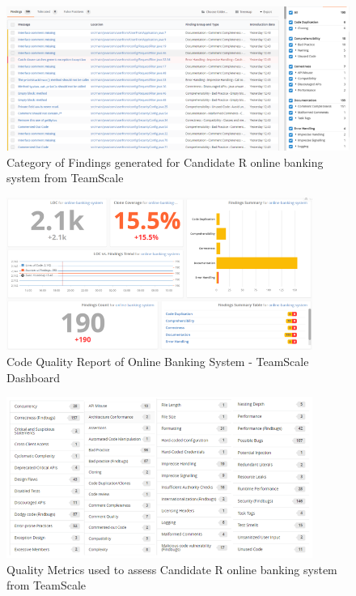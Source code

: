 \documentclass[letterpaper, 11pt]{report}
\begin{document}
\begin{figure}[htb]
\begin{center}
\includegraphics[width=13cm]{D1-Reengineering Opportunity/images/Picture7.png}
\caption{Category of Findings generated for Candidate R online banking system from TeamScale}
\end{center}
\end{figure}

\begin{figure}[htb]
\begin{center}
\includegraphics[width=10cm]{D1-Reengineering Opportunity/images/Picture9.png}
\caption{Code Quality Report of Online Banking System - TeamScale Dashboard}
\end{center}
\end{figure}

\begin{figure}[htb]
\begin{center}
\includegraphics[width=10cm]{D1-Reengineering Opportunity/images/Picture8.png}
\caption{Quality Metrics used to assess Candidate R online banking system from TeamScale}
\end{center}
\end{figure}
\end{document}
